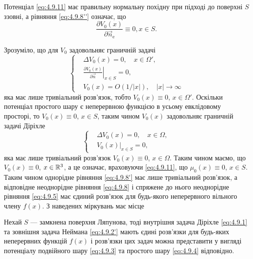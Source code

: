 Потенціал \eqref{eq:4.9.11} має правильну нормальну похідну при підході до поверхні $S$ ззовні, а рівняння \eqref{eq:4.9.8''} означає, що
\begin{equation}
	\label{eq:4.9.12}
	\frac{\partial V_0(x)}{\partial \vec n_{\text{e}}} \equiv 0, x \in S.
\end{equation}

Зрозуміло, що для $V_0$ задовольняє граничній задачі
\begin{equation}
	\label{eq:4.9.13}
	\left\{
		\begin{aligned}
			& \Delta V_0(x) = 0, \quad x \in \Omega', \\
			& \left. \frac{\partial V_0(x)}{\partial \vec n} \right|_{x \in S} = 0,\\
			& V_0(x) = O(1/|x|), \quad |x| \to \infty
		\end{aligned}
	\right.
\end{equation}
яка має лише тривіальний розв'язок, тобто $V_0(x) \equiv 0$, $x \in \Omega'$. Оскільки потенціал простого шару є неперервною функцією в усьому евклідовому просторі, то $V_0(x) \equiv 0$, $x \in S$, таким чином $V_0(x)$ задовольняє граничній задачі Діріхле
\begin{equation}
	\left\{
		\begin{aligned}
			& \Delta V_0(x) = 0, \quad x \in \Omega, \\
			& \left .V_0(x) \right|_{x \in S} = 0,
		\end{aligned}
	\right.
\end{equation}
яка має лише тривіальний розв'язок $V_0(x) \equiv 0$, $x \in \Omega$. Таким чином маємо, що $V_0(x) \equiv 0$, $x \in \mathbb{R}^3$, а це означає, враховуючи \eqref{eq:4.9.11}, що $\mu_0(x) \equiv 0$, $x \in S$. Таким чином однорідне рівняння \eqref{eq:4.9.8'} має лише тривіальний розв'язок, а відповідне неоднорідне рівняння \eqref{eq:4.9.8} і спряжене до нього неоднорідне рівняння \eqref{eq:4.9.5} має єдиний розв'язок для будь-якого неперервного вільного члену $f(x)$. З наведених міркувань має місце 

\begin{theorem}
	Нехай $S$ --- замкнена поверхня Ляпунова, тоді внутрішня задача Діріхле \eqref{eq:4.9.1} та зовнішня задача Неймана \eqref{eq:4.9.2'} мають єдині розв'язки для будь-яких неперервних функцій $f(x)$ і розв'язки цих задач можна представити у вигляді потенціалу подвійного шару \eqref{eq:4.9.3} та простого шару \eqref{eq:4.9.4} відповідно.
\end{theorem}

